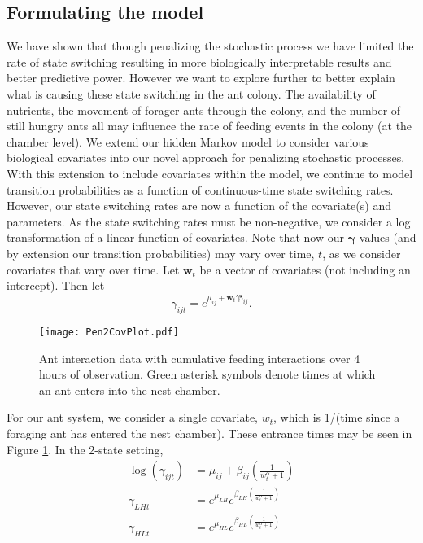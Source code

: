 \documentclass[smallextended]{svjour3}       %
\begin{document}
\subsection{Formulating the model}
We have shown that though penalizing the stochastic process we have limited the rate of state switching resulting in more biologically interpretable results and better predictive power. However we want to explore further to better explain what is causing these state switching in the ant colony. The availability of nutrients, the movement of forager ants through the colony, and the number of still hungry ants all may influence the rate of feeding events in the colony (at the chamber level). We extend our hidden Markov model to consider various biological covariates into our novel approach for penalizing stochastic processes. 
With this extension to include covariates within the model, we continue to model transition probabilities as a function of continuous-time state switching rates. However, our state switching rates are now a function of the covariate(s) and parameters. As the state switching rates must be non-negative, we consider a log transformation of a linear function of  covariates. Note that now our $\bm{\gamma}$ values (and by extension our transition probabilities) may vary over time, $t$, as we consider covariates that vary over time. Let $\bm{w}_t$ be a vector of covariates (not including an intercept). Then let 
\begin{equation}
\gamma_{ijt} = e^{\mu_{ij} + \bm{w}_t' \bm{\beta}_{ij}}.
\end{equation}
\begin{figure}
 \centerline{\texttt{[image: Pen2CovPlot.pdf]}}
 \caption{Ant interaction data with cumulative feeding interactions over 4 hours of observation. Green asterisk symbols denote times at which an ant enters into the nest chamber.}
\label{f:pencov}
\end{figure}
For our ant system, we consider a single covariate, $w_t$, which is 1/(time since a foraging ant has entered the nest chamber). These entrance times may be seen in Figure \ref{f:pencov}. In the 2-state setting,
\begin{equation}
\begin{aligned}
\log (\gamma_{ijt}) &= \mu_{ij} + \beta_{ij} \left(\frac{1}{w_t^{\alpha} + 1}\right) \\
\gamma_{LHt} &= e^{\mu_{LH}} e^{\beta_{LH}\left(\frac{1}{w_t^{\alpha} + 1}\right)}\\
\gamma_{HLt} &= e^{\mu_{HL}} e^{\beta_{HL}\left(\frac{1}{w_t^{\alpha} + 1}\right)}\\
\end{aligned}
\end{equation}
\end{document}
